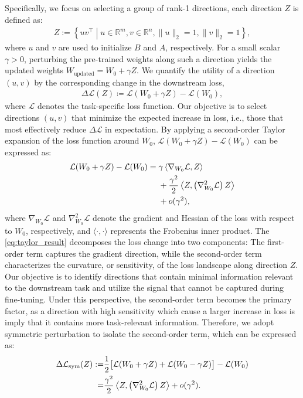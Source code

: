 \documentclass{article}
\theoremstyle{plain}
\theoremstyle{definition}
\theoremstyle{remark}
\begin{document}
Specifically, we focus on selecting a group of rank-1 directions, each direction $Z$ is defined as:
\begin{align}
Z := \left\{ u v^\top \middle| u \in \mathbb{R}^m, v \in \mathbb{R}^n, \|u\|_2 = 1,\|v\|_2 = 1 \right\},
\end{align}
where $u$ and $v$ are used to initialize $B$ and $A$, respectively.
For a small scalar $\gamma > 0$, perturbing the pre-trained weights along such a direction yields the updated weights $W_{\text{updated}} = W_0 + \gamma Z$.
We quantify the utility of a direction $(u,v)$ by the corresponding change in the downstream loss,
\begin{align}
\Delta \mathcal{L}(Z) \coloneqq \mathcal{L}(W_0 + \gamma Z) - \mathcal{L}(W_0), 
\end{align}
where $\mathcal{L}$ denotes the task-specific loss function. Our objective is to select directions $(u,v)$ that minimize the expected increase in loss, i.e., those that most effectively reduce $\Delta \mathcal{L}$ in expectation. By applying a second-order Taylor expansion of the loss function around $W_0$, $\mathcal{L}(W_0 + \gamma Z)- \mathcal{L}(W_0)$ can be expressed as:
\begin{align}
\mathcal{L}(W_0 + \gamma Z) - \mathcal{L}(W_0) = {} & \gamma \left\langle \nabla_{W_0} \mathcal{L}, Z \right\rangle \notag \\
& + \frac{\gamma^2}{2} \left\langle Z, \left(\nabla_{W_0}^2 \mathcal{L}\right) Z \right\rangle \notag \\
& + o(\gamma^2), \label{eq:taylor_result}
\end{align}
where $\nabla_{W_0} \mathcal{L}$ and $\nabla_{W_0}^2 \mathcal{L}$ denote the gradient and Hessian of the loss with respect to $W_0$, respectively, and $\langle \cdot, \cdot \rangle$ represents the Frobenius inner product. The \eqref{eq:taylor_result} decomposes the loss change into two components: The first-order term captures the gradient direction, while the second-order term characterizes the curvature, or sensitivity, of the loss landscape along direction $Z$. Our objective is to identify directions that contain minimal information relevant to the downstream task and utilize the signal that cannot be captured during fine-tuning. Under this perspective, the second-order term becomes the primary factor, as a direction with high sensitivity which cause a larger increase in loss is imply that it contains more task-relevant information. Therefore, we adopt symmetric perturbation to isolate the second-order term, which can be expressed as:
\begin{align}
\Delta \mathcal{L}_{\text{sym}}(Z) := & \frac{1}{2}\big[\mathcal{L}(W_0 + \gamma Z) + \mathcal{L}(W_0 - \gamma Z)\big] - \mathcal{L}(W_0) \notag\\
= & \frac{\gamma^2}{2} \left\langle Z, \left(\nabla_{W_0}^2 \mathcal{L}\right) Z \right\rangle + o(\gamma^2).
\end{align}
\end{document}
